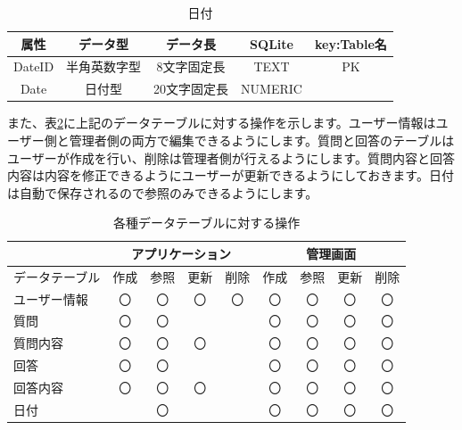 \documentclass[a4j]{jarticle}
\begin{document}
\begin{table}[H]
    \caption{日付}
    \label{tbl: date}
    \begin{center}
        \begin{tabular}{|c|c|c|c|c|} \hline
            属性 & データ型 & データ長 & SQLite & key:Table名\\ \hline \hline
            DateID & 半角英数字型 & 8文字固定長 & TEXT & PK\\ \hline
            Date & 日付型 & 20文字固定長 & NUMERIC & \\ \hline
        \end{tabular}
    \end{center}
\end{table}


また、表\ref{tbl: datatable}に上記のデータテーブルに対する操作を示します。ユーザー情報はユーザー側と管理者側の両方で編集できるようにします。質問と回答のテーブルはユーザーが作成を行い、削除は管理者側が行えるようにします。質問内容と回答内容は内容を修正できるようにユーザーが更新できるようにしておきます。日付は自動で保存されるので参照のみできるようにします。

\begin{table}[H]
    \caption{各種データテーブルに対する操作}
    \label{tbl: datatable}
    \begin{center}
        \begin{tabular}{|l||c|c|c|c||c|c|c|c|} \hline
             & \multicolumn{4}{|c||}{アプリケーション} & \multicolumn{4}{|c|}{管理画面}\\ \hline
            データテーブル & \multicolumn{1}{|l|}{作成} & \multicolumn{1}{|l|}{参照} & \multicolumn{1}{|l|}{更新} & \multicolumn{1}{|l||}{削除} & \multicolumn{1}{|l|}{作成} & \multicolumn{1}{|l|}{参照} & \multicolumn{1}{|l|}{更新} & \multicolumn{1}{|l|}{削除}\\ \hline \hline
            ユーザー情報 & 〇 & 〇 & 〇 & 〇 & 〇 & 〇 & 〇 & 〇\\ \hline
            質問 & 〇 & 〇 &  &  & 〇 & 〇 & 〇 & 〇\\ \hline
            質問内容 & 〇 & 〇 & 〇 &  & 〇 & 〇 & 〇 & 〇\\ \hline
            回答 & 〇 & 〇 &  &  & 〇 & 〇 & 〇 & 〇\\ \hline
            回答内容 & 〇 & 〇 & 〇 &  & 〇 & 〇 & 〇 & 〇\\ \hline
            日付 &  & 〇 &  &  & 〇 & 〇 & 〇 & 〇\\ \hline
        \end{tabular}
    \end{center}
\end{table}
\end{document}
